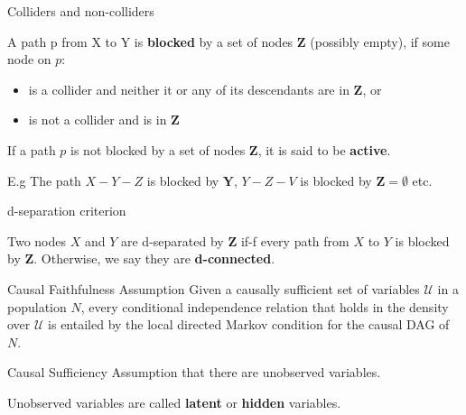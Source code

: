 \documentclass[english, compress, red]{beamer}
\begin{document}
\begin{frame}{Colliders and non-colliders}
	\begin{definition}
		A path p from X to Y is \textbf{blocked} by a set of nodes $\mathbf{Z}$ (possibly empty), if some node on $p$:
		\begin{itemize}
		\item is a collider and neither it or any of its descendants are in $\mathbf{Z}$, or
		\item is not a collider and is in $\mathbf{Z}$
		\end{itemize}
	\end{definition}
    \begin{definition}
	If a path $p$ is not blocked by a set of nodes $\mathbf{Z}$, it is said to be \textbf{active}.
	\end{definition}

E.g The path $X-Y-Z$ is blocked by $\mathbf{Y}$, $Y-Z-V$ is blocked by $\mathbf{Z}=\emptyset$ etc.
\end{frame}

\begin{frame}{d-separation criterion}
	\begin{definition}Two nodes $X$ and $Y$ are d-separated by $\mathbf{Z}$ if-f every path from $X$ to $Y$ is blocked by $\mathbf{Z}$. Otherwise, we say they are \textbf{d-connected}.
	\end{definition}	
\end{frame}

\begin{frame}{Causal Faithfulness Assumption}
	Given a causally sufficient set of variables $\mathcal{U}$ in a population $N$, every conditional independence relation that holds in the density over $\mathcal{U}$ is entailed by the local directed Markov condition for the causal DAG of $N$.
\end{frame}

\begin{frame}{Causal Sufficiency}
	Assumption that there are unobserved variables.
	
	Unobserved variables are called \textbf{latent} or \textbf{hidden} variables.
	
\end{frame}
\end{document}
